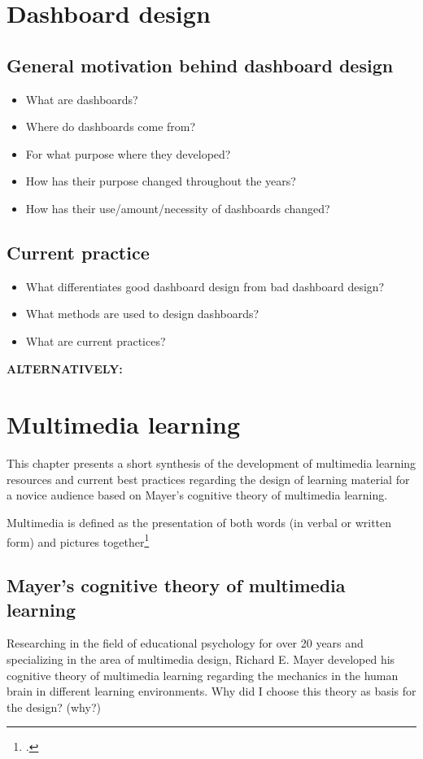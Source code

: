 \chapter{Dashboard design}

\section{General motivation behind dashboard design} \label{sec:DashboardGeneral}
\begin{itemize}
    \item What are dashboards?
    \item Where do dashboards come from?
    \item For what purpose where they developed?
    \item How has their purpose changed throughout the years?
    \item How has their use/amount/necessity of dashboards changed?
\end{itemize}
\section{Current practice} \label{sec:Dashboard_CurrentPractice}
\begin{itemize}
    \item What differentiates good dashboard design from bad dashboard design?
    \item What methods are used to design dashboards?
    \item What are current practices?
\end{itemize}




\textbf{ALTERNATIVELY: }

\chapter{Multimedia learning} \label{chapter:Multimedia}

This chapter presents a short synthesis of the development of multimedia learning resources and current best practices regarding the design of learning material for a novice audience based on Mayer's cognitive theory of multimedia learning. 

Multimedia is defined as the presentation of both words (in verbal or written form) and pictures together\footcites[Cf.][p.2]{}

\section{Mayer's cognitive theory of multimedia learning}
Researching in the field of educational psychology for over 20 years and specializing in the area of multimedia design, Richard E. Mayer developed his cognitive theory of multimedia learning regarding the mechanics in the human brain in different learning environments. 
Why did I choose this theory as basis for the design? (why?)

